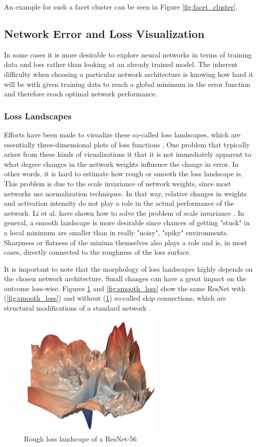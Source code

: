 \documentclass{acmsiggraph}               %
\begin{document}
An example for such a facet cluster can be seen in Figure \ref{fig:facet_cluster}.


\subsection{Network Error and Loss Visualization}
In some cases it is more desirable to explore neural networks in terms of training data and loss rather than looking at an already trained model.
The inherent difficulty when choosing a particular network architecture is knowing how hard it will be with given training data to reach a global minimum in the error function and therefore reach optimal network performance.

\subsubsection{Loss Landscapes}
Efforts have been made to visualize these so-called loss landscapes, which are essentially three-dimensional plots of loss functions \cite{Li2017}.
One problem that typically arises from these kinds of visualizations it that it is not immediately apparent to what degree changes in the network weights influence the change in error. In other words, it is hard to estimate how rough or smooth the loss landscape is. This problem is due to the scale invariance of network weights, since most networks use normalization techniques. In that way, relative changes in weights and activation intensity do not play a role in the actual performance of the network. Li et al. have shown how to solve the problem of scale invariance \cite{Li2017}. In general, a smooth landscape is more desirable since chances of getting "stuck" in a local minimum are smaller than in really "noisy", "spiky" environments. Sharpness or flatness of the minima themselves also plays a role and is, in most cases, directly connected to the roughness of the loss surface.

It is important to note that the morphology of loss landscapes highly depends on the chosen network architecture. Small changes can have a great impact on the outcome loss-wise. Figures \ref{fig:rough_loss} and \ref{fig:smooth_loss} show the same ResNet with (\ref{fig:smooth_loss}) and without (\ref{fig:rough_loss}) so-called skip connections, which are structural modifications of a standard network \cite{He2015}.

\begin{figure}
\centering
\includegraphics[width=2.75in]{rough_loss}
\caption{Rough loss landscape of a ResNet-56 \protect\cite{Li2017}}
\label{fig:rough_loss}
\end{figure}
\end{document}
